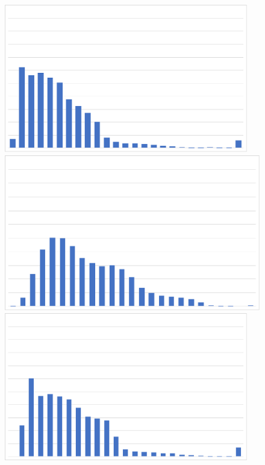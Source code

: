 \begin{figure}
\begin{minipage}[t]{0.33\linewidth}%
\begin{framed}
\setcounter{subfigure}{0}
\begin{minipage}[t]{0.49\textwidth}%
\centering
\includegraphics[width=0.95\textwidth]{results/sw4/Eul1_AvgL2.pdf}%
\vspace{-3mm}
\end{minipage}%
\hfill
\begin{minipage}[t]{0.49\textwidth}%
\centering
\includegraphics[width=0.95\linewidth]{results/sw4/Eul2_AvgL2.pdf}
\vspace{-3mm}
\end{minipage}
\begin{minipage}[t]{0.49\textwidth}%
\centering
\includegraphics[width=0.95\textwidth]{results/sw4/Eul1_Max.pdf}%

\end{minipage}
\end{framed}
\end{minipage}
\end{figure}
